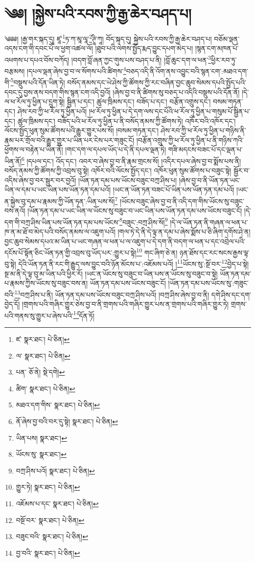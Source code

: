 \setcounter{footnote}{0} 
\chapter{༄༅། །སྐྱེས་པའི་རབས་ཀྱི་རྒྱ་ཆེར་བཤད་པ།}༄༅༅། །རྒྱ་གར་སྐད་དུ། ཛཱ་\footnote{ཛ་  སྣར་ཐང་།  པེ་ཅིན། }ཏ་ཀ་མཱ་ལཱ་\footnote{ལ་  སྣར་ཐང་།  པེ་ཅིན། }ཊཱི་ཀཱ། བོད་སྐད་དུ། སྐྱེས་པའི་རབས་ཀྱི་རྒྱ་ཆེར་བཤད་པ། བཅོམ་ལྡན་འདས་ངག་གི་དབང་པོ་ལ་ཕྱག་འཚལ་ལོ། །ཐུབ་པའི་ལེགས་སྤྱོད་རྨད་བྱུང་དཔག་མེད་པ། །སྙན་ངག་མཁན་པོ་འཕགས་པ་དཔའ་བོས་བཀོད། །བདག་བློ་ཞན་ཀྱང་གུས་པས་བཤད་པ་ནི། །བློ་ཆུང་དག་ལ་ཕན་\footnote{པན་  ཅོ་ནེ།  སྡེ་དགེ། }ཕྱིར་རབ་ཏུ་བརྩམས། །དཔལ་ལྡན་ཞེས་བྱ་བ་ལ་སོགས་པའི་ཚིགས་\footnote{ཚིག་  སྣར་ཐང་།  པེ་ཅིན། }བཅད་འདི་ནི་འོག་ནས་འབྱུང་བའི་སྙན་ངག་:མཐའ་དག་གི་\footnote{མཐའ་དག་གིས་  སྣར་ཐང་།  པེ་ཅིན། }བསྡུས་པའི་དོན་ཡིན་ཏེ། བསོད་ནམས་དང་ཡེ་ཤེས་ཀྱི་ཚོགས་ཀྱི་རང་བཞིན་བྱང་ཆུབ་སེམས་དཔའི་སྤྱོད་པའི་དབང་དུ་བྱས་ནས་བདག་གིས་སྙན་ངག་འདི་བྱའོ། །ཞེས་བྱ་བ་ནི་ཚིགས་སུ་བཅད་པ་འདིའི་བསྡུས་པའི་དོན་ནོ། །དེ་ལ་ཕ་རོལ་ཏུ་ཕྱིན་པ་དྲུག་སྟེ། སྦྱིན་པ་དང་། ཚུལ་ཁྲིམས་དང་། བཟོད་པ་དང་། བརྩོན་འགྲུས་དང་། བསམ་གཏན་དང་། ཤེས་རབ་ཀྱི་ཕ་རོལ་ཏུ་ཕྱིན་པའོ། །ཕ་རོལ་ཏུ་ཕྱིན་པ་དེ་དག་ལས་དང་པོའི་ཕ་རོལ་ཏུ་ཕྱིན་པ་གསུམ་པོ་སྦྱིན་པ་དང་། ཚུལ་ཁྲིམས་དང་། བཟོད་པའི་ཕ་རོལ་ཏུ་ཕྱིན་པ་ནི་བསོད་ནམས་ཀྱི་ཚོགས་ཏེ། འཁོར་བའི་འཁོར་དང་། ལོངས་སྤྱོད་ཕུན་སུམ་ཚོགས་པའི་རྒྱུར་གྱུར་པས་སོ། །བསམ་གཏན་དང་། ཤེས་རབ་ཀྱི་ཕ་རོལ་ཏུ་ཕྱིན་པ་གཉིས་ནི་རྣམ་པར་གྲོལ་བའི་རྒྱུར་གྱུར་པ་ཡིན་པར་ངེས་པར་གཟུང་ངོ། །བརྩོན་འགྲུས་ཀྱི་ཕ་རོལ་ཏུ་ཕྱིན་པ་ནི་གཉིས་ཀའི་ཕྱོགས་ལ་བརྟེན་པ་ཡིན་ནོ། །གང་དག་ལ་དཔལ་ཡོད་པ་དེ་ནི་དཔལ་ལྡན་ཏེ། གཟི་མདངས་བཟང་པོ་དང་ལྡན་པ་ཡིན་ནོ།\footnote{ནོ་ཞེས་བྱ་བའི་བར་དུ་སྟེ།  སྣར་ཐང་།  པེ་ཅིན། } །དཔལ་དང་། འོད་དང་། འབར་བ་ཞེས་བྱ་བ་ནི་རྣམ་གྲངས་སོ། །འདིར་དཔལ་ཞེས་བྱ་བ་སྨོས་པས་ནི། བསོད་ནམས་ཀྱི་ཚོགས་ཀྱི་འབྲས་བུ་སྟེ། འཁོར་བའི་ལོངས་སྤྱོད་དང་། འཁོར་ཕུན་སུམ་ཚོགས་པ་བཟུང་སྟེ། སྦྱོར་བ་འདིས་ཞེས་བྱ་བར་སྦྱར་བར་བྱའོ། །ཡོན་ཏན་དམ་པས་ཡོངས་བཟུང་བཀྲ་ཤིས་པ། །ཞེས་བྱ་བ་ནི་ཡོན་ཏན་ཡང་ཡིན་ལ་དམ་པ་ཡང་ཡིན་པས་ཡོན་ཏན་དམ་པའོ། །ཡང་ན་ཡོན་ཏན་བཟང་པོ་ཡིན་པས་ཡོན་ཏན་དམ་པའོ། །ཡང་ན་སྐྱེས་བུ་དམ་པ་རྣམས་ཀྱི་ཡོན་ཏན་:ཡིན་པས་སོ།\footnote{ཡིན་པས།  སྣར་ཐང་། } །ཡོངས་བཟུང་ཞེས་བྱ་བ་ནི་འདི་དག་གིས་ཡོངས་སུ་བཟུང་བས་ནའོ། །ཡོན་ཏན་དམ་པ་ཡང་ཡིན་ལ་ཡོངས་སུ་བཟུང་བ་ཡང་ཡིན་པས་ཡོན་ཏན་དམ་པས་ཡོངས་བཟུང་ངོ། །དེ་དག་གི་བཀྲ་ཤིས་ཡིན་པས་ཡོན་ཏན་དམ་པས་ཡོངས་\footnote{ཡོངས་སུ་  སྣར་ཐང་། }བཟུང་:བཀྲ་ཤིས་སོ།\footnote{བཀྲ་ཤིས་པའོ།  སྣར་ཐང་།  པེ་ཅིན། } །དེ་ལ་ཡོན་ཏན་ནི་གཞན་ལ་ཕན་པ་ཁ་ན་མ་ཐོ་བ་མེད་པའི་བསོད་ནམས་ལ་འཇུག་པའོ། །གལ་ཏེ་དེ་ནི་དེ་ལྟ་ན་དམ་པ་ཞེས་སྨོས་པ་ཅི་ཞིག་དགོས་ཤེ་ན། བྱང་ཆུབ་སེམས་དཔའ་མ་ཡིན་པ་ཡང་གཞན་ལ་ཕན་པ་ལ་འཇུག་པ་དེ་དག་ནི་བདག་ལ་ཕན་པ་དང་འབྲེལ་པའི་དངོས་པོ་སྟོན་ཅིང་ཡོན་ཏན་གྱི་འབྲས་བུ་ཡོད་པར་:གྱུར་པ་སྟེ།\footnote{གྱུར་ཏེ།  སྣར་ཐང་།  པེ་ཅིན། } གང་ཞིག་ཅེ་ན། ཉན་ཐོས་དང་རང་སངས་རྒྱས་ལྟ་བུ་སྟེ། དེའི་ཡོན་ཏན་ནི་རང་གི་རྒྱུད་ལས་བྱུང་བའི་ཉོན་མོངས་པ་:འཇོམས་པའོ། །\footnote{འཇོམས་པ་དང་  སྣར་ཐང་།  པེ་ཅིན། }ཡོངས་སུ་:སྔོ་བར་\footnote{བསྔོ་བར་  སྣར་ཐང་།  པེ་ཅིན། }བྱེད་པ་སྟེ། སྔ་མ་ནི་དེ་ལྟ་བུ་མ་ཡིན་པའི་ཕྱིར་རོ། །ཡང་ན་ཡོངས་སུ་བཟུང་བ་ཡིན་པས་ན་ཡོངས་སུ་བཟུང་བ་སྟེ། ཡོན་ཏན་དམ་པ་རྣམས་ཀྱིས་ཡོངས་སུ་བཟུང་བས་ན། ཡོན་ཏན་དམ་པས་ཡོངས་བཟུང་ངོ། །ཡོན་ཏན་དམ་པས་ཡོངས་སུ་:གཟུང་བའི་\footnote{བཟུང་བའི་  སྣར་ཐང་།  པེ་ཅིན། }བཀྲ་ཤིས་པ་ནི། ཡོན་ཏན་དམ་པས་ཡོངས་བཟུང་བཀྲ་ཤིས་པའོ། །བཀྲ་ཤིས་ཞེས་བྱ་བ་ནི། དགེ་ཤིས་དང་དག་བྱེད་དོ། །གྲགས་པའི་གཞིར་གྱུར་ཅེས་བྱ་བ་ནི་གྲགས་པའི་གཞིར་གྱུར་པས་ན་གྲགས་པའི་གཞིར་གྱུར་ཏེ། གྲགས་པའི་གནས་སུ་གྱུར་པ་ཞེས་པའི་\footnote{བྱ་བའི་  སྣར་ཐང་།  པེ་ཅིན། }དོན་ཏོ། 